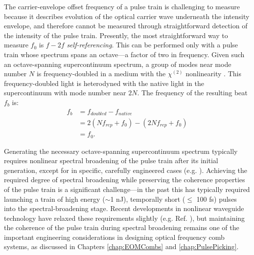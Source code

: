 The carrier-envelope offset frequency of a pulse train is challenging to measure because it describes evolution of the optical carrier wave underneath the intensity envelope, and therefore cannot be measured through straightforward detection of the intensity of the pulse train. Presently, the most straightforward way to measure $f_0$ is $f-2f$ \textit{self-referencing}. This can be performed only with a pulse train whose spectrum spans an octave---a factor of two in frequency. Given such an octave-spanning supercontinuum spectrum, a group of modes near mode number $N$ is frequency-doubled in a medium with the $\chi^{(2)}$ nonlinearity \cite{Boyd2003}. This frequency-doubled light is heterodyned with the native light in the supercontinuum with mode number near $2N$. The frequency of the resulting beat $f_b$ is:
\begin{align}
f_b&=f_{doubled}-f_{native}\\
&=2(Nf_{rep}+f_0)-(2Nf_{rep}+f_0)\\
&=f_0.
\end{align}

Generating the necessary octave-spanning supercontinuum spectrum typically requires nonlinear spectral broadening of the pulse train after its initial generation, except for in specific, carefully engineered cases (e.g. \cite{Fortier2003}). Achieving the required degree of spectral broadening while preserving the coherence properties of the pulse train is a significant challenge---in the past this has typically required launching a train of high energy ($\sim$1 nJ), temporally short ($\leq$ 100 fs) pulses into the spectral-broadening stage. Recent developments in nonlinear waveguide technology have relaxed these requirements slightly (e.g. Ref. \cite{Carlson2017}), but maintaining the coherence of the pulse train during spectral broadening remains one of the important engineering considerations in designing optical frequency comb systems, as discussed in Chapters \ref{chap:EOMCombs} and \ref{chap:PulsePicking}. 


